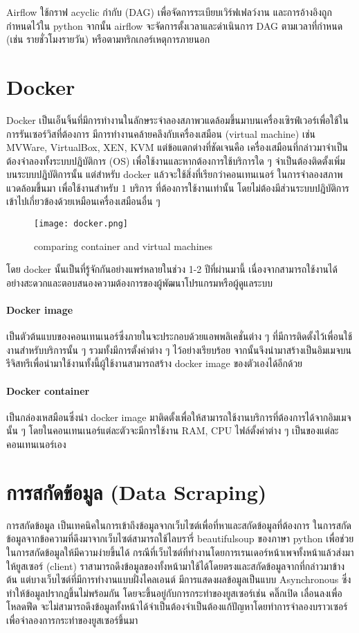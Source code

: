 Airflow ใช้กราฟ acyclic กำกับ (DAG) เพื่อจัดการระเบียบเวิร์ฟเฟลว์งาน และการอ้างอิงถูกกำหนดไว้ใน python จากนั้น airflow จะจัดการตั้งเวลาและดำเนินการ DAG ตามเวลาที่กำหนด (เช่น รายชั่วโมงรายวัน) หรือตามทริกเกอร์เหตุการภายนอก


\section{Docker}
Docker \cite{docker} เป็นเอ็นจิ้นที่มีการทำงานในลักษระจำลองสภาพวแดล้อมขึ้นมาบนเครื่องเซิรฟ์เวอร์เพื่อใช้ในการรันเซอร์วิสที่ต้องการ มีการทำงานคล้ายคลึงกับเครื่องเสมือน (virtual machine) เช่น MVWare, VirtualBox, XEN, KVM แต่ข้อแตกต่างที่ชัดเจนคือ เครื่องเสมือนที่กล่าวมาจำเป็นต้องจำลองทั้งระบบปฎิบัติการ (OS) เพื่อใช้งานและหากต้องการใช้บริการใด ๆ จำเป็นต้องติดตั้งเพิ่มบนระบบปฎิบัติการนั้น แต่สำหรับ docker แล้วจะใช้สิ่งที่เรียกว่าคอนเทนเนอร์ ในการจำลองสภาพแวดล้อมขึ้นมา เพื่อใช้งานสำหรับ 1 บริการ ที่ต้องการใช้งานเท่านั้น โดยไม่ต้องมีส่วนระบบปฎิบัติการเข้าไปเกี่ยวข้องด้วยเหมือนเครื่องเสมือนอื่น ๆ
\newline
\begin{figure}[!h]
  \centering
  \texttt{[image: docker.png]}  
  \caption{comparing container and virtual machines}
  \label{Fig:docker}
\end{figure}
โดย docker นั้นเป็นที่รู้จักกันอย่างแพร่หลายในช่วง 1-2 ปีที่ผ่านมานี้ เนื่องจากสามารถใช้งานได้อย่างสะดวกและตอบสนองความต้องการของผู้พัฒนาโปรแกรมหรือผู้ดูแลระบบ
\paragraph*{Docker image}
เป็นตัวต้นแบบของคอนเทนเนอร์ซึ่งภายในจะประกอบด้วยแอพพลิเคชั่นต่าง ๆ ที่มีการติดตั้งไว้เพื่อนใช้งานสำหรับบริการนั้น ๆ รวมทั้งมีการตั้งค่าต่าง ๆ ไว้อย่างเรียบร้อย จากนั้นจึงนำมาสร้างเป็นอิมเมจบนรีจิสทรีเพื่อนำมาใช้งานทั้งนี้ผู้ใช้งานสามารถสร้าง docker image ของตัวเองได้อีกด้วย
\paragraph*{Docker container}
เป็นกล่องเหสมือนซึ่งนำ docker image มาติดตั้งเพื่อให้สามารถใช้งานบริการที่ต้องการได้จากอิมเมจนั้น ๆ โดยในคอนเทนเนอร์แต่ละตัวจะมีการใช้งาน RAM, CPU ไฟล์ตั้งค่าต่าง ๆ เป็นของแต่ละคอนเทนเนอร์เอง


\section{การสกัดข้อมูล (Data Scraping)}
การสกัดข้อมูล \cite{choochart} เป็นเทคนิคในการเข้าถึงข้อมูลจากเว็บไซต์เพื่อที่หาและสกัดข้อมูลที่ต้องการ ในการสกัดข้อมูลจากข้อความที่ดึงมาจากเว็บไซต์สามารถใช้ไลบรารี่ beautifulsoup ของภาษา python เพื่อช่วยในการสกัดข้อมูลให้มีความง่ายขึ้นได้ กรณีที่เว็บไซต์ที่ทำงานโดยการเรนเดอร์หน้าเพจทั้งหน้าแล้วส่งมาให้ยูสเซอร์ (client) ราสามารถดึงข้อมูลของทั้งหน้ามาใช้ได้โดยตรงและสกัดข้อมูลจากที่กล่าวมาข้างต้น แต่บางเว็บไซต์ที่มีการทำงานแบบฝั่งไคลเอนต์ มีการแสดงผลข้อมูลเป็นแบบ Asynchronous ซึ่งทำให้ข้อมูลปรากฎขึ้นไม่พร้อมกัน โดยจะขึ้นอยู่กับการกระทำของยูสเซอร์เช่น คลิ๊กเปิด เลื่อนลงเพื่อโหลดฟีด จะไม่สามารถดึงข้อมูลทั้งหน้าได้จำเป็นต้องจำเป็นต้องแก้ปัญหาโดยทำการจำลองบราวเซอร์เพื่อจำลองการกระทำของยูสเซอร์ขึ้นมา

